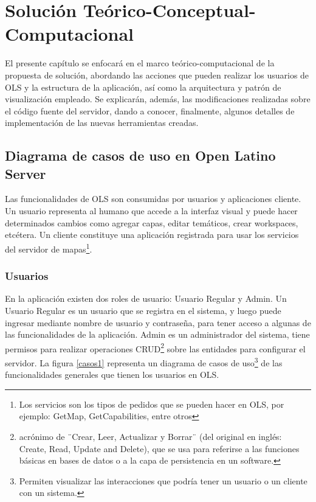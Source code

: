 
\chapter{Soluci\'on Te\'orico-Conceptual-Computacional}

El presente cap\'itulo se enfocar\'a en el marco te\'orico-computacional de la propuesta de soluci\'on, abordando las acciones que pueden realizar los usuarios de OLS y la estructura de la aplicaci\'on, as\'i como la arquitectura y patr\'on de visualizaci\'on empleado. Se explicar\'an, adem\'as, las modificaciones realizadas sobre el c\'odigo fuente del servidor, dando a conocer, finalmente, algunos detalles de implementaci\'on de las nuevas herramientas creadas.

\section{Diagrama de casos de uso en Open Latino Server}
Las funcionalidades de OLS son consumidas por usuarios y aplicaciones cliente. Un usuario representa al humano que accede a la interfaz visual y puede hacer determinados cambios como agregar capas, editar tem\'aticos, crear workspaces, etc\'etera. Un cliente constituye una aplicaci\'on registrada para usar los servicios del servidor de mapas\footnote{Los servicios son los tipos de pedidos que se pueden hacer en OLS, por ejemplo: GetMap, GetCapabilities, entre otros}.


\subsection{Usuarios}
En la aplicaci\'on existen dos roles de usuario: Usuario Regular y Admin. Un Usuario Regular es un usuario que se registra en el sistema, y luego puede ingresar mediante nombre de usuario y contrase\~na, para tener acceso a algunas de las funcionalidades de la aplicaci\'on. Admin es un administrador del sistema, tiene permisos para realizar operaciones CRUD\footnote{acr\'onimo de ¨Crear, Leer, Actualizar y Borrar¨ (del original en ingl\'es: Create, Read, Update and Delete), que se usa para referirse a las funciones b\'asicas en bases de datos o a la capa de persistencia en un software.} sobre las entidades para configurar el servidor. La figura \ref{casos1} representa un diagrama de casos de uso\footnote{Permiten visualizar las interacciones que podr\'ia tener un usuario o un cliente con un sistema.} de las funcionalidades generales que tienen los usuarios en OLS.

